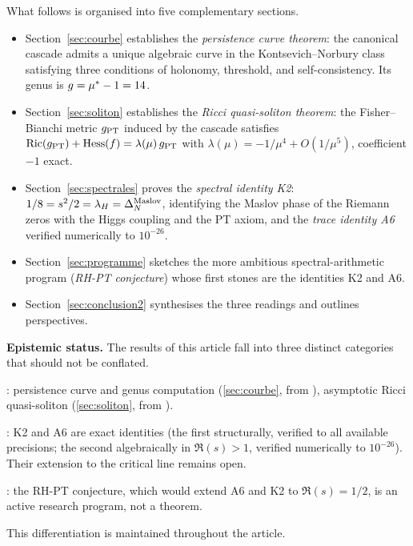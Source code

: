 What follows is organised into five complementary sections.
\begin{itemize}[nosep,leftmargin=*]
\item Section~\ref{sec:courbe} establishes the \emph{persistence curve theorem}: the canonical cascade admits a unique algebraic curve in the Kontsevich--Norbury class satisfying three conditions of holonomy, threshold, and self-consistency. Its genus is $g = \mu^{*} - 1 = 14$.
\item Section~\ref{sec:soliton} establishes the \emph{Ricci quasi-soliton theorem}: the Fisher--Bianchi metric $g_{\rm PT}$ induced by the cascade satisfies $\mathrm{Ric}(g_{\rm PT}) + \mathrm{Hess}(f) = \lambda(\mu)\, g_{\rm PT}$ with $\lambda(\mu) = -1/\mu^{4} + O(1/\mu^{5})$, coefficient $-1$ exact.
\item Section~\ref{sec:spectrales} proves the \emph{spectral identity K2}: $1/8 = s^{2}/2 = \lambda_H = \Delta_N^{\rm Maslov}$, identifying the Maslov phase of the Riemann zeros with the Higgs coupling and the PT axiom, and the \emph{trace identity A6} verified numerically to $10^{-26}$.
\item Section~\ref{sec:programme} sketches the more ambitious spectral-arithmetic program (\emph{RH-PT conjecture}) whose first stones are the identities K2 and A6.
\item Section~\ref{sec:conclusion2} synthesises the three readings and outlines perspectives.
\end{itemize}

\textbf{Epistemic status.} The results of this article fall into three distinct categories that should not be conflated.
\begin{description}[nosep,leftmargin=*]
\item[Theorems proved unconditionally]: persistence curve and genus computation (\ref{sec:courbe}, from \cite{PT_GeoFlow_PersistenceCurve}), asymptotic Ricci quasi-soliton (\ref{sec:soliton}, from \cite{PT_GeoFlow_RicciSoliton}).
\item[Proved identities]: K2 and A6 are exact identities (the first structurally, verified to all available precisions; the second algebraically in $\Re(s) > 1$, verified numerically to $10^{-26}$). Their extension to the critical line remains open.
\item[Conjectural program]: the RH-PT conjecture, which would extend A6 and K2 to $\Re(s) = 1/2$, is an active research program, not a theorem.
\end{description}
This differentiation is maintained throughout the article.
